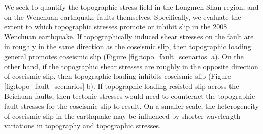 \documentclass[draft,jgrga]{AGUTeX}
\begin{document}
\begin{article}
We seek to quantify the topographic stress field in the Longmen Shan region,
and on the Wenchuan earthquake faults themselves. Specifically, we evaluate the
extent to which topographic stresses promote or inhibit slip in the 2008
Wenchuan earthquake. If topographically induced shear stresses on the fault are
in roughly in the same direction as the coseismic slip, then topographic
loading general promotes coseismic slip (Figure \ref{fig:topo_fault_scenarios}
a). On the other hand, if the topographic shear stresses are roughly in the
opposite direction of coseismic slip, then topographic loading inhibits
coseismic slip (Figure \ref{fig:topo_fault_scenarios} b). If topographic
loading resisted slip across the Beichuan faults, then tectonic stresses would
need to counteract the topographic fault stresses for the coseismic slip to
result. On a smaller scale, the heterogeneity of coseismic slip in the
earthquake may be influenced by shorter wavelength variations in topography and
topographic stresses.



\end{article}
\end{document}
